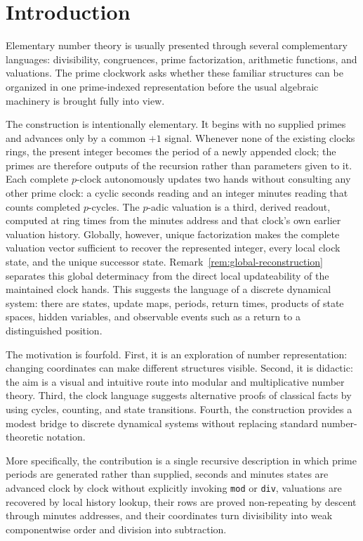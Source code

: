 \documentclass[11pt,a4paper]{article}
\theoremstyle{clockplain}
\theoremstyle{definition}
\theoremstyle{remark}
\begin{document}
\section{Introduction}

Elementary number theory is usually presented through several complementary languages: divisibility, congruences, prime factorization, arithmetic functions, and valuations. The prime clockwork asks whether these familiar structures can be organized in one prime-indexed representation before the usual algebraic machinery is brought fully into view.

The construction is intentionally elementary. It begins with no supplied primes and advances only by a common $+1$ signal. Whenever none of the existing clocks rings, the present integer becomes the period of a newly appended clock; the primes are therefore outputs of the recursion rather than parameters given to it. Each complete $p$-clock autonomously updates two hands without consulting any other prime clock: a cyclic seconds reading and an integer minutes reading that counts completed $p$-cycles. The $p$-adic valuation is a third, derived readout, computed at ring times from the minutes address and that clock's own earlier valuation history. Globally, however, unique factorization makes the complete valuation vector sufficient to recover the represented integer, every local clock state, and the unique successor state. Remark~\ref{rem:global-reconstruction} separates this global determinacy from the direct local updateability of the maintained clock hands. This suggests the language of a discrete dynamical system: there are states, update maps, periods, return times, products of state spaces, hidden variables, and observable events such as a return to a distinguished position.

The motivation is fourfold. First, it is an exploration of number representation: changing coordinates can make different structures visible. Second, it is didactic: the aim is a visual and intuitive route into modular and multiplicative number theory. Third, the clock language suggests alternative proofs of classical facts by using cycles, counting, and state transitions. Fourth, the construction provides a modest bridge to discrete dynamical systems without replacing standard number-theoretic notation.

More specifically, the contribution is a single recursive description in which prime periods are generated rather than supplied, seconds and minutes states are advanced clock by clock without explicitly invoking \texttt{mod} or \texttt{div}, valuations are recovered by local history lookup, their rows are proved non-repeating by descent through minutes addresses, and their coordinates turn divisibility into weak componentwise order and division into subtraction.
\end{document}
